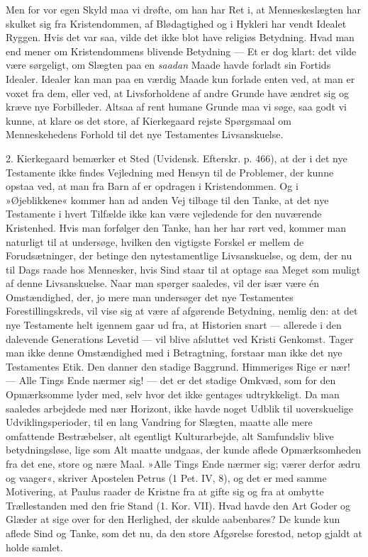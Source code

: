 \documentclass[12pt,a4paper,openany]{book}
\newcommand{\opage}[1]{\marginnote{\footnotesize\textit{[#1]}}}
\begin{document}
Men for vor egen Skyld maa vi drøfte, om han har
Ret i, at Menneskeslægten har skulket sig fra Kristendommen,
af Blødagtighed og i Hykleri har vendt Idealet
Ryggen. Hvis det var saa, vilde det ikke blot have
religiøs Betydning. Hvad man end mener om Kristendommens
blivende Betydning --- Et er dog klart: det
vilde være sørgeligt, om Slægten paa en \textit{saadan} Maade
havde forladt sin Fortids Idealer. Idealer kan man paa
en værdig Maade kun forlade enten ved, at man er
voxet fra dem, eller ved, at Livsforholdene af andre
Grunde have ændret sig og kræve nye Forbilleder. Altsaa
af rent humane Grunde maa vi søge, saa godt vi
kunne, at klare os det store, af Kierkegaard rejste
Spørgsmaal om Menneskehedens Forhold til det nye
Testamentes Livsanskuelse.

2. Kierkegaard bemærker et Sted (Uvidensk. Efterskr.
p. 466), at der i det nye Testamente ikke findes
Vejledning med Hensyn til de Problemer, der kunne opstaa
ved, at man fra Barn af er opdragen i Kristendommen.
Og i »Øjeblikkene« kommer han ad anden Vej tilbage
til den Tanke, at det nye Testamente i hvert Tilfælde
ikke kan være vejledende for den nuværende
Kristenhed. Hvis man forfølger den Tanke, han her har
rørt ved, kommer man naturligt til at undersøge, hvilken
den vigtigste Forskel er mellem de Forudsætninger, der
betinge den nytestamentlige Livsanskuelse, og dem, der
nu til Dags raade hos Mennesker, hvis Sind staar
til at optage saa Meget som muligt af denne Livsanskuelse.
Naar man spørger saaledes, vil der især være
\opage{152}én Omstændighed, der, jo mere man undersøger det nye
Testamentes Forestillingskreds, vil vise sig at være af
afgørende Betydning, nemlig den: at det nye Testamente
helt igennem gaar ud fra, at Historien snart --- allerede
i den dalevende Generations Levetid --- vil blive afsluttet
ved Kristi Genkomst. Tager man ikke denne Omstændighed
med i Betragtning, forstaar man ikke det nye
Testamentes Etik. Den danner den stadige Baggrund.
Himmeriges Rige er nær! --- Alle Tings Ende nærmer
sig! --- det er det stadige Omkvæd, som for den Opmærksomme
lyder med, selv hvor det ikke gentages udtrykkeligt.
Da man saaledes arbejdede med nær Horizont,
ikke havde noget Udblik til uoverskuelige Udviklingsperioder,
til en lang Vandring for Slægten, maatte alle
mere omfattende Bestræbelser, alt egentligt Kulturarbejde,
alt Samfundsliv blive betydningsløse, lige som Alt maatte
undgaas, der kunde aflede Opmærksomheden fra det ene,
store og nære Maal. »Alle Tings Ende nærmer sig;
værer derfor ædru og vaager«, skriver Apostelen Petrus
(1 Pet. IV, 8), og det er med samme Motivering, at
Paulus raader de Kristne fra at gifte sig og fra at ombytte
Trællestanden med den frie Stand (1. Kor. VII).
Hvad havde den Art Goder og Glæder at sige over for
den Herlighed, der skulde aabenbares? De kunde kun
aflede Sind og Tanke, som det nu, da den store Afgørelse
forestod, netop gjaldt at holde samlet.
\end{document}
